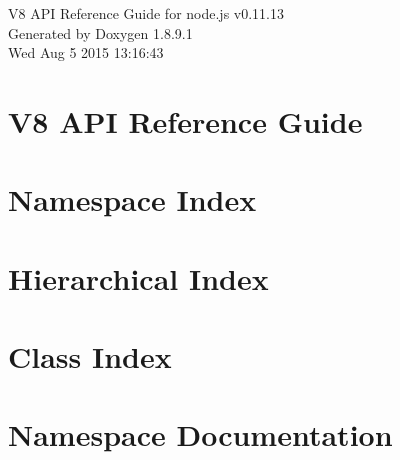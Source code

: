 \documentclass[twoside]{book}
\newcommand{\+}{\discretionary{\mbox{\scriptsize$\hookleftarrow$}}{}{}}
\newcommand{\clearemptydoublepage}{%
  \newpage{\pagestyle{empty}\cleardoublepage}%
}
\begin{document}
\hypersetup{pageanchor=false,
             bookmarks=true,
             bookmarksnumbered=true,
             pdfencoding=unicode
            }
\begin{titlepage}
\vspace*{7cm}
\begin{center}%
{\Large V8 A\+P\+I Reference Guide for node.\+js v0.11.13 }\\
\vspace*{1cm}
{\large Generated by Doxygen 1.8.9.1}\\
\vspace*{0.5cm}
{\small Wed Aug 5 2015 13:16:43}\\
\end{center}
\end{titlepage}
\clearemptydoublepage
\tableofcontents
\clearemptydoublepage
{}
\hypersetup{pageanchor=true}

\chapter{V8 A\+P\+I Reference Guide}
\label{index}\hypertarget{index}{}
\chapter{Namespace Index}

\chapter{Hierarchical Index}

\chapter{Class Index}

\chapter{Namespace Documentation}

\end{document}
